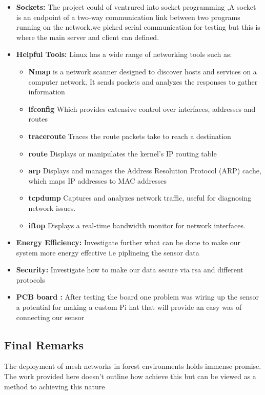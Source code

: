 \begin{itemize}
    \item \textbf{Sockets:} The project could of ventrured into socket programming ,A socket is an endpoint of a two-way communication link between two programs running on the network.we picked serial communication for testing  but this is where the main server and client can defined.
    \item \textbf{Helpful Tools:}  Linux has a wide range of networking tools such as:
    \begin{itemize}
        \item\textbf{Nmap} is a network scanner designed to discover hosts and services on a computer network. It sends packets and analyzes the responses to gather information 
        \item \textbf{ifconfig} Which provides extensive control over interfaces, addresses and routes
        \item \textbf{traceroute} Traces the route packets take to reach a destination
        \item \textbf{route} Displays or manipulates the kernel's IP routing table
        \item \textbf{arp} Displays and manages the Address Resolution Protocol (ARP) cache, which maps IP addresses to MAC addresses
        \item \textbf{tcpdump} Captures and analyzes network traffic, useful for diagnosing network issues.
        \item \textbf{iftop} Displays a real-time bandwidth monitor for network interfaces.
    \end{itemize} 
    \item \textbf{Energy Efficiency:} Investigate further what can be done to make  our system more energy effective i.e piplineing the sensor data
    \item \textbf{Security:} Investigate how to make our data secure via rsa and different protocols
    \item \textbf{PCB board :} After testing the board one problem was wiring up the sensor a potential for making a custom  Pi hat that will provide an easy was of connecting  our sensor 
 
   
\end{itemize}

\subsection{Final Remarks}
The deployment of mesh networks in forest environments holds immense promise. The work provided here doesn't outline how achieve this but can be viewed as a method to achieving  this nature